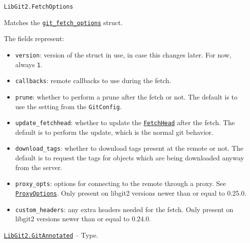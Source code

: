 \begin{adjustwidth}{2em}{0pt}


\begin{verbatim}
LibGit2.FetchOptions
\end{verbatim}

Matches the \href{https://libgit2.org/libgit2/\#HEAD/type/git\_fetch\_options}{\texttt{git\_fetch\_options}} struct.

The fields represent:

\begin{itemize}
\item \texttt{version}: version of the struct in use, in case this changes later. For now, always \texttt{1}.


\item \texttt{callbacks}: remote callbacks to use during the fetch.


\item \texttt{prune}: whether to perform a prune after the fetch or not. The default is to  use the setting from the \texttt{GitConfig}.


\item \texttt{update\_fetchhead}: whether to update the \hyperlink{17806809481919147110}{\texttt{FetchHead}} after the fetch.  The default is to perform the update, which is the normal git behavior.


\item \texttt{download\_tags}: whether to download tags present at the remote or not. The default  is to request the tags for objects which are being downloaded anyway from the server.


\item \texttt{proxy\_opts}: options for connecting to the remote through a proxy. See \hyperlink{1179613637206861638}{\texttt{ProxyOptions}}.  Only present on libgit2 versions newer than or equal to 0.25.0.


\item \texttt{custom\_headers}: any extra headers needed for the fetch. Only present on libgit2 versions  newer than or equal to 0.24.0.

\end{itemize}


\end{adjustwidth}
\hypertarget{9263689983564368210}{}
\hyperlink{9263689983564368210}{\texttt{LibGit2.GitAnnotated}}  -- {Type.}


